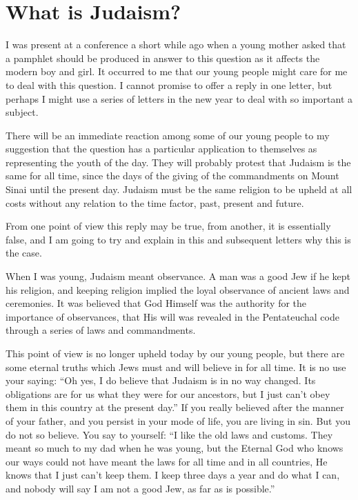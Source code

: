 \chapter{What is Judaism?}

I was present at a conference a short while ago when a
young mother asked that a pamphlet should be produced in
answer to this question as it affects the modern boy and
girl. It occurred to me that our young people might care
for me to deal with this question. I cannot promise to
offer a reply in one letter, but perhaps I might use a
series of letters in the new year to deal with so important
a subject.

There will be an immediate reaction among some of our
young people to my suggestion that the question has a
particular application to themselves as representing the
youth of the day. They will probably protest that Judaism
is the same for all time, since the days of the giving of
the commandments on Mount Sinai until the present day.
Judaism must be the same religion to be upheld at all costs
without any relation to the time factor, past, present and
future.

From one point of view this reply may be true, from
another, it is essentially false, and I am going to try and
explain in this and subsequent letters why this is the
case.

When I was young, Judaism meant observance. A man was
a good Jew if he kept his religion, and keeping religion
implied the loyal observance of ancient laws and ceremonies.
It was believed that God Himself was the authority
for the importance of observances, that His will was
revealed in the Pentateuchal code through a series of laws
and commandments.

This point of view is no longer upheld today by our
young people, but there are some eternal truths which Jews
must and will believe in for all time. It is no use your
saying: ``Oh yes, I do believe that Judaism is in no way
changed. Its obligations are for us what they were for our
ancestors, but I just can't obey them in this country at
the present day.'' If you really believed after the manner
of your father, and you persist in your mode of life, you
are living in sin. But you do not so believe. You say to
yourself: ``I like the old laws and customs. They meant so
much to my dad when he was young, but the Eternal God who
knows our ways could not have meant the laws for all time
and in all countries, He knows that I just can't keep
them. I keep three days a year and do what I can, and
nobody will say I am not a good Jew, as far as is
possible.''

